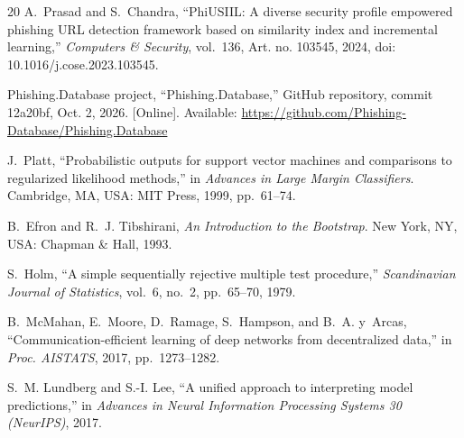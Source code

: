 \documentclass[conference]{IEEEtran}
\begin{document}
\begin{thebibliography}{20}
A.~Prasad and S.~Chandra, ``PhiUSIIL: A diverse security profile empowered phishing URL detection framework based on similarity index and incremental learning,'' \emph{Computers \& Security}, vol.~136, Art. no. 103545, 2024, doi: 10.1016/j.cose.2023.103545.

Phishing.Database project, ``Phishing.Database,'' GitHub repository, commit 12a20bf, Oct. 2, 2026. [Online]. Available: \url{https://github.com/Phishing-Database/Phishing.Database}

J.~Platt, ``Probabilistic outputs for support vector machines and comparisons to regularized likelihood methods,'' in \emph{Advances in Large Margin Classifiers}. Cambridge, MA, USA: MIT Press, 1999, pp.~61--74.

B.~Efron and R.~J. Tibshirani, \emph{An Introduction to the Bootstrap}. New York, NY, USA: Chapman \& Hall, 1993.

S.~Holm, ``A simple sequentially rejective multiple test procedure,'' \emph{Scandinavian Journal of Statistics}, vol.~6, no.~2, pp.~65--70, 1979.

B.~McMahan, E.~Moore, D.~Ramage, S.~Hampson, and B.~A. y~Arcas, ``Communication-efficient learning of deep networks from decentralized data,'' in \emph{Proc. AISTATS}, 2017, pp.~1273--1282.

S.~M. Lundberg and S.-I. Lee, ``A unified approach to interpreting model predictions,'' in \emph{Advances in Neural Information Processing Systems 30 (NeurIPS)}, 2017.

\end{thebibliography}
\end{document}
